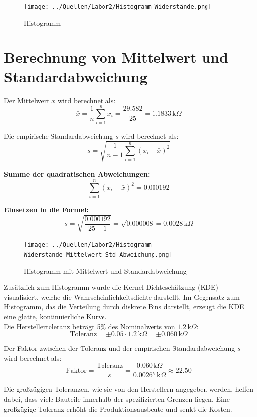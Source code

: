 \documentclass[a4paper,12pt]{article}
\begin{document}
\begin{figure}[H]
    \centering
    \texttt{[image: ../Quellen/Labor2/Histogramm-Widerstände.png]}
\caption{Histogramm}
\end{figure}

\section*{Berechnung von Mittelwert und Standardabweichung}

Der Mittelwert \( \bar{x} \) wird berechnet als:
\[
\bar{x} = \frac{1}{n} \sum_{i=1}^{n} x_i = \frac{29.582}{25} = 1.1833 \, \text{k}\Omega
\]

Die empirische Standardabweichung \( s \) wird berechnet als:
\[
s = \sqrt{\frac{1}{n-1} \sum_{i=1}^{n} (x_i - \bar{x})^2}
\]

\textbf{Summe der quadratischen Abweichungen:}
\[
\sum_{i=1}^{n} (x_i - \bar{x})^2 = 0.000192
\]

\textbf{Einsetzen in die Formel:}
\[
s = \sqrt{\frac{0.000192}{25 - 1}} = \sqrt{0.000008} = 0.0028 \, \text{k}\Omega
\]

\begin{figure}[H]
    \centering
    \texttt{[image: ../Quellen/Labor2/Histogramm-Widerstände\_Mittelwert\_Std\_Abweichung.png]}
\caption{Histogramm mit Mittelwert und Standardabweichung}
\end{figure}

\noindent Zusätzlich zum Histogramm wurde die Kernel-Dichteschätzung (KDE) visualisiert, welche die Wahrscheinlichkeitsdichte darstellt. Im Gegensatz zum Histogramm, das die Verteilung durch diskrete Bins darstellt, erzeugt die KDE eine glatte, kontinuierliche Kurve.\\

\noindent Die Herstellertoleranz beträgt 5\% des Nominalwerts von \( 1.2 \, \text{k}\Omega \):
\[
\text{Toleranz} = \pm 0.05 \cdot 1.2 \, \text{k}\Omega = \pm 0.060 \, \text{k}\Omega
\]

\noindent Der Faktor zwischen der Toleranz und der empirischen Standardabweichung \( s \) wird berechnet als:
\[
\text{Faktor} = \frac{\text{Toleranz}}{s} = \frac{0.060 \, \text{k}\Omega}{0.00267 \, \text{k}\Omega} \approx 22.50
\]

\noindent Die großzügigen Toleranzen, wie sie von den Herstellern angegeben werden, helfen dabei, dass viele Bauteile innerhalb der spezifizierten Grenzen liegen. Eine großzügige Toleranz erhöht die Produktionsausbeute und senkt die Kosten.
\end{document}
